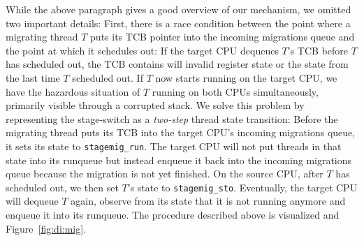 \documentclass[12pt,a4paper]{book}
\begin{document}
While the above paragraph gives a good overview of our mechanism, we omitted two important details:
First, there is a race condition between the point where a migrating thread $T$ puts its TCB pointer into the incoming migrations queue and the point at which it schedules out:
If the target CPU dequeues $T$'s TCB before $T$ has scheduled out, the TCB contains will invalid register state or the state from the last time $T$ scheduled out.
If $T$ now starts running on the target CPU, we have the hazardous situation of $T$ running on both CPUs simultaneously, primarily visible through a corrupted stack.
We solve this problem by representing the stage-switch as a \emph{two-step} thread state transition:
Before the migrating thread puts its TCB into the target CPU's incoming migrations queue, it sets its state to \lstinline[style=figurecpp]{stagemig_run}.
The target CPU will not put threads in that state into its runqueue but instead enqueue it back into the incoming migrations queue because the migration is not yet finished.
On the source CPU, after $T$ has scheduled out, we then set $T$'s state to \lstinline[style=figurecpp]{stagemig_sto}.
Eventually, the target CPU will dequeue $T$ again, observe from its state that it is not running anymore and enqueue it into its runqueue.
The procedure described above is visualized and Figure~\ref{fig:di:mig}.
\end{document}
